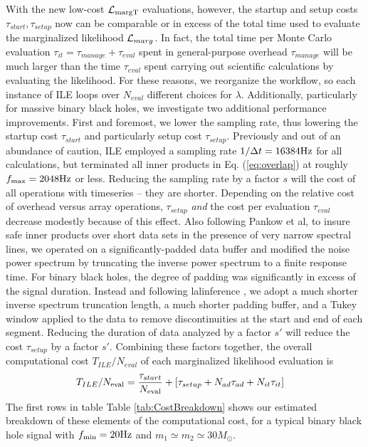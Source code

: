 \documentclass[twocolumn,prd,nofootinbib]{revtex4}
\newcommand\unit[1]{{\rm #1}}
\newcommand\ILE{ILE}
\begin{document}
With the new low-cost ${\cal L}_{\rm margT}$ evaluations, however, the startup and setup costs  $\tau_{start},\tau_{setup}$ now can be
comparable or in excess of the total time used to evaluate the marginalized likelihood ${\cal L}_{marg}$.   In fact, the total time per Monte Carlo
evaluation $\tau_{it}=\tau_{manage}+\tau_{eval}$  spent in general-purpose overhead $\tau_{manage}$ will be much larger than the time $\tau_{eval}$ spent
carrying out scientific calculations by evaluating the likelihood.  For these reasons, we reorganize the workflow, so each
instance of ILE loops over
$N_{eval}$ different choices for $\lambda$. 
%
Additionally, particularly for massive binary black holes, we investigate two additional performance improvements.  First and
foremost, we lower the sampling rate, thus lowering the startup cost $\tau_{start}$ and particularly setup cost
$\tau_{setup}$.  Previously and out of an abundance of caution, \ILE{} employed a sampling rate $1/\Delta t = 16384
\unit{Hz}$ for all calculations, but terminated all inner products in Eq. (\ref{eq:overlap}) at roughly $f_{\rm
  max}=2048\unit{Hz}$ or less.   Reducing the sampling rate by a factor $s$ will the  cost of all operations with
timeseries -- they are shorter.  Depending on the relative cost of overhead versus array operations,  $\tau_{setup}$
\emph{and} the cost per evaluation $\tau_{eval}$ decrease modestly because of this effect.  
Also following Pankow et al, to insure safe inner products over short data sets in the presence of very narrow spectral lines, we operated on a
significantly-padded data buffer and modified the noise power spectrum by truncating the inverse power spectrum to a
finite response time.  For binary black holes, the degree of padding was significantly
in excess of the signal duration.  
Instead and following lalinference \cite{gw-astro-PE-lalinference-v1}, we adopt a much shorter inverse spectrum truncation length, a much shorter padding buffer, and
a Tukey window applied to the data to remove discontinuities at the start and end of each segment.   
Reducing the duration of data analyzed by a factor $s'$ will reduce the cost $\tau_{setup}$ by a factor $s'$.  
%
Combining these factors together, the overall computational cost  $T_{ILE}/N_{eval}$  of each marginalized likelihood
evaluation is
\begin{align}
T_{ILE}/N_{\rm eval} &= \frac{\tau_{start}}{N_{\rm eval}} 
 + 
 [ \tau_{setup} + N_{ad} \tau_{ad} + N_{it}\tau_{it}
 ] 
\end{align}
The first rows in table Table  \ref{tab:CostBreakdown} shows our estimated breakdown of these elements of the computational cost, for a typical binary black hole signal with $f_{\rm min}=20 \unit{Hz}$ and $m_1\simeq m_2\simeq 30 M_\odot$.
\end{document}
